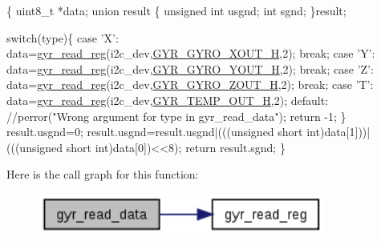 \begin{DoxyCode}
\{
  uint8\_t *data;
  \textcolor{keyword}{union }result
  \{
    \textcolor{keywordtype}{unsigned} \textcolor{keywordtype}{int} usgnd;
    \textcolor{keywordtype}{int} sgnd;
  \}result;

  \textcolor{keywordflow}{switch}(type)\{
    \textcolor{keywordflow}{case} \textcolor{charliteral}{'X'}:
      data=\hyperlink{group__gyr_gad817a3b69d4c3026b7a9b6de32753e7b}{gyr\_read\_reg}(i2c\_dev,\hyperlink{imu__regs_8h_a45d3d3c92328dd02072aae7d8cf14ad0}{GYR\_GYRO\_XOUT\_H},2);
      \textcolor{keywordflow}{break};
    \textcolor{keywordflow}{case} \textcolor{charliteral}{'Y'}:
      data=\hyperlink{group__gyr_gad817a3b69d4c3026b7a9b6de32753e7b}{gyr\_read\_reg}(i2c\_dev,\hyperlink{imu__regs_8h_a7664c10b8291231d44694e154c218fab}{GYR\_GYRO\_YOUT\_H},2);
      \textcolor{keywordflow}{break};
    \textcolor{keywordflow}{case} \textcolor{charliteral}{'Z'}:
      data=\hyperlink{group__gyr_gad817a3b69d4c3026b7a9b6de32753e7b}{gyr\_read\_reg}(i2c\_dev,\hyperlink{imu__regs_8h_ae4d2753664f152db1bef259f99975b4c}{GYR\_GYRO\_ZOUT\_H},2);
      \textcolor{keywordflow}{break};
    \textcolor{keywordflow}{case} \textcolor{charliteral}{'T'}:
      data=\hyperlink{group__gyr_gad817a3b69d4c3026b7a9b6de32753e7b}{gyr\_read\_reg}(i2c\_dev,\hyperlink{imu__regs_8h_a7d00eaf1ea076429433ad0c787b48200}{GYR\_TEMP\_OUT\_H},2);
    \textcolor{keywordflow}{default}:
      \textcolor{comment}{//perror("Wrong argument for type in gyr\_read\_data");}
      \textcolor{keywordflow}{return} -1;
  \}
  result.usgnd=0;
  result.usgnd=result.usgnd|(((\textcolor{keywordtype}{unsigned} \textcolor{keywordtype}{short} int)data[1]))|(((\textcolor{keywordtype}{unsigned} \textcolor{keywordtype}{short} \textcolor{keywordtype}{
      int})data[0])<<8);
  \textcolor{keywordflow}{return} result.sgnd;
\}
\end{DoxyCode}


Here is the call graph for this function\-:
\nopagebreak
\begin{figure}[H]
\begin{center}
\leavevmode
\includegraphics[width=268pt]{group__gyr_ga271b37e9ace81b18bb2f83787247d262_cgraph}
\end{center}
\end{figure}


